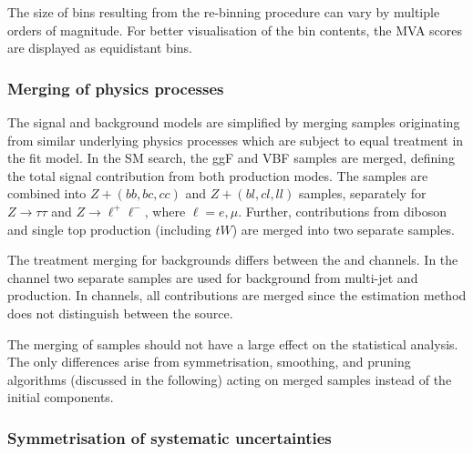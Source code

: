 The size of bins resulting from the re-binning procedure can vary by
multiple orders of magnitude. For better visualisation of the bin
contents, the MVA scores are displayed as equidistant bins.




\subsubsection{Merging of physics processes}

The signal and background models are simplified by merging samples
originating from similar underlying physics processes which are
subject to equal treatment in the fit model. In the SM \HH search, the
ggF and VBF samples are merged, defining the total signal contribution
from both production modes. The \Zjets samples are combined into
$Z + (bb,bc,cc)$ and $Z + (bl,cl,ll)$ samples, separately for
$Z \to \tau\tau$ and $Z \to \ell^+\ell^-$, where $\ell = e,
\mu$. Further, contributions from diboson and single top production
(including $tW$) are merged into two separate samples.

The treatment merging for \faketauhadvis backgrounds differs between
the \hadhad and \lephad channels. In the \hadhad channel two separate
samples are used for \tauhadvis background from multi-jet and \ttbar
production. In \lephad channels, all \faketauhadvis contributions are
merged since the estimation method does not distinguish between the
\faketauhadvis source.

The merging of samples should not have a large effect on the
statistical analysis. The only differences arise from symmetrisation,
smoothing, and pruning algorithms (discussed in the following) acting
on merged samples instead of the initial components.


\subsubsection{Symmetrisation of systematic uncertainties}


